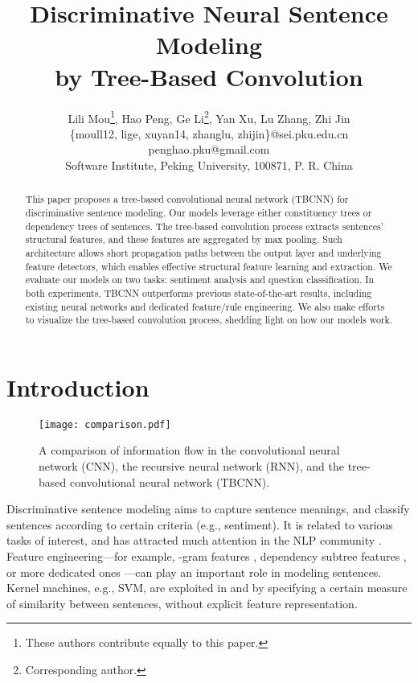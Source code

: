 \documentclass[11pt,a4paper]{article}
\title{Discriminative Neural Sentence Modeling\\
 by Tree-Based Convolution}
\author{Lili Mou\thanks{These authors contribute equally to this paper.},
Hao Peng,
Ge Li\thanks{Corresponding author.}, Yan Xu, Lu Zhang, Zhi Jin\\
\{moull12, lige, xuyan14, zhanglu, zhijin\}@sei.pku.edu.cn\\
penghao.pku@gmail.com\\
Software Institute, Peking University, 100871, P. R. China
}
\date{}
\begin{document}
\maketitle



\begin{abstract}
This paper proposes a tree-based convolutional neural network (TBCNN)
for discriminative sentence modeling.
Our models leverage either constituency trees or
dependency trees of sentences.
The tree-based convolution process extracts sentences' structural features, and
these features are aggregated by max pooling.
Such architecture allows short propagation paths between the output layer and 
underlying feature detectors, which enables
effective structural feature learning and extraction.
We evaluate our models on two tasks: sentiment analysis and question classification.
In both experiments, TBCNN outperforms previous state-of-the-art results,
including existing neural networks and dedicated feature/rule engineering.
We also make efforts to visualize the tree-based convolution process,
shedding light on how our models work.
\end{abstract}


\section{Introduction}
\begin{figure*}[!t]
\centering
\vspace{-.2cm}

\texttt{[image: comparison.pdf]}

\vspace{-.5cm}
\caption{A comparison of information flow in the convolutional neural network (CNN), the
recursive neural network (RNN), and the tree-based convolutional neural network (TBCNN).
}\label{fCompare}

\vspace{-.3cm}
\end{figure*}

Discriminative sentence modeling aims to capture sentence meanings,
and classify sentences according to certain criteria (e.g., sentiment).
It is related to various tasks of interest,
and has attracted much attention in the NLP community \cite{classify_sen,classify_sen_2,AdaCNN}.
Feature engineering---for example, -gram features \cite{ngram}, 
dependency subtree features \cite{dependencyfeature}, or more dedicated ones \cite{QC}---can
play an important role in modeling sentences.
Kernel machines, e.g., SVM, are exploited in 
 and  by
specifying a certain measure of similarity between sentences, without
explicit feature representation.
\end{document}

